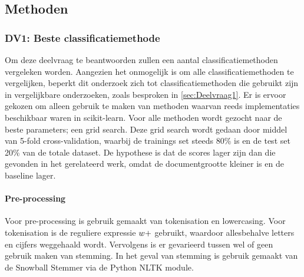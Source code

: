 \subsection{Methoden}


\subsubsection{DV1: Beste classificatiemethode}
Om deze deelvraag te beantwoorden zullen een aantal classificatiemethoden vergeleken worden. Aangezien het onmogelijk is om alle classificatiemethoden te vergelijken, beperkt dit onderzoek zich tot classificatiemethoden die gebruikt zijn in vergelijkbare onderzoeken, zoals besproken in \ref{sec:Deelvraag1}. Er is ervoor gekozen om alleen gebruik te maken van methoden waarvan reeds implementaties beschikbaar waren in scikit-learn. Voor alle methoden wordt gezocht naar de beste parameters; een grid search. Deze grid search wordt gedaan door middel van 5-fold cross-validation, waarbij de trainings set steeds 80\% is en de test set 20\% van de totale dataset. De hypothese is dat de scores lager zijn dan die gevonden in het gerelateerd werk, omdat de documentgrootte kleiner is en de baseline lager.

\paragraph{Pre-processing}
Voor pre-processing is gebruik gemaakt van tokenisation en lowercasing. Voor tokenisation is de reguliere expressie $\\w+$ gebruikt, waardoor allesbehalve letters en cijfers weggehaald wordt. Vervolgens is er gevarieerd tussen wel of geen gebruik maken van stemming. In het geval van stemming is gebruik gemaakt van de Snowball Stemmer via de Python NLTK module.

